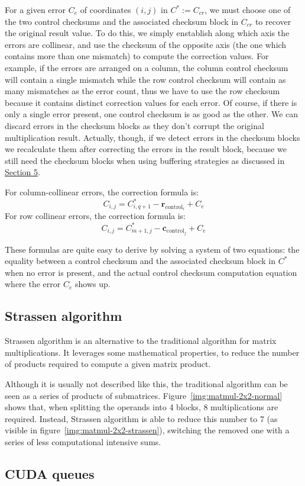 For a given error $C_e$ of coordinates $(i,j)$ in $C^* := C_{cr}$, we must choose one of the two control checksums and the associated checksum block in $C_{cr}$ to recover the original result value.
To do this, we simply enstablish along which axis the errors are collinear, and use the checksum of the opposite axis (the one which contains more than one mismatch) to compute the correction values.
For example, if the errors are arranged on a column, the column control checksum will contain a single mismatch while the row control checksum will contain as many mismatches as the error count, thus we have to use the row checksum because it contains distinct correction values for each error.
Of course, if there is only a single error present, one control checksum is as good as the other.
We can discard errors in the checksum blocks
as they don't corrupt the original multiplication result.
Actually, though, if we detect errors in the checksum blocks
we recalculate them after correcting the errors in the result block,
because we still need the checksum blocks
when using buffering strategies as discussed in \hyperref[sec:strategies]{Section 5}.

For column-collinear errors, the correction formula is:
\[
	C_{i,j} = C^*_{i,q+1} - \mathbf{r}_{\text{control}_{i}} + C_e
\]
For row collinear errors, the correction formula is:
\[
	C_{i,j} = C^*_{m+1,j} - \mathbf{c}_{\text{control}_{j}} + C_e
\]

These formulas are quite easy to derive by solving a system of two equations:
the equality between a control checksum and the associated checksum block in $C^*$ when no error is present,
and the actual control checksum computation equation where the error $C_e$ shows up.

\subsection{Strassen algorithm}

Strassen algorithm is an alternative to the traditional algorithm for matrix multiplications.
It leverages some mathematical properties, to reduce the number of products required to compute a given matrix product.

Although it is usually not described like this, the traditional algorithm can be seen as a series of products of submatrices.
Figure~\ref{img:matmul-2x2-normal} shows that, when splitting the operands into 4 blocks, 8 multiplications are required.
Instead, Strassen algorithm is able to reduce this number to 7 (as visible in figure~\ref{img:matmul-2x2-strassen}), switching the removed one with a series of less computational intensive sums.

\subsection{CUDA queues}
